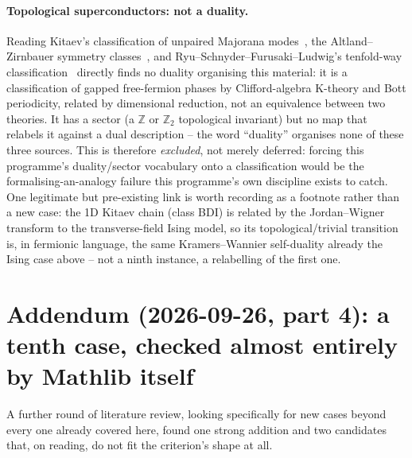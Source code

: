 \documentclass[11pt,a4paper]{article}
\begin{document}
\paragraph{Topological superconductors: not a duality.} Reading Kitaev's classification of unpaired Majorana
modes~\cite{Kitaev2001}, the Altland--Zirnbauer symmetry classes~\cite{AltlandZirnbauer1997}, and
Ryu--Schnyder--Furusaki--Ludwig's tenfold-way classification~\cite{RyuSchnyderFurusakiLudwig2010} directly finds
no duality organising this material: it is a classification of gapped free-fermion phases by Clifford-algebra
K-theory and Bott periodicity, related by dimensional reduction, not an equivalence between two theories. It has
a sector (a $\mathbb Z$ or $\mathbb Z_2$ topological invariant) but no map that relabels it against a dual
description -- the word ``duality'' organises none of these three sources. This is therefore \emph{excluded},
not merely deferred: forcing this programme's duality/sector vocabulary onto a classification would be the
formalising-an-analogy failure this programme's own discipline exists to catch. One legitimate but
pre-existing link is worth recording as a footnote rather than a new case: the 1D Kitaev chain (class BDI) is
related by the Jordan--Wigner transform to the transverse-field Ising model, so its topological/trivial
transition is, in fermionic language, the same Kramers--Wannier self-duality already the Ising case above --
not a ninth instance, a relabelling of the first one.

\section*{Addendum (2026-09-26, part 4): a tenth case, checked almost entirely by Mathlib itself}
A further round of literature review, looking specifically for new cases beyond every one already covered here,
found one strong addition and two candidates that, on reading, do not fit the criterion's shape at all.
\end{document}
